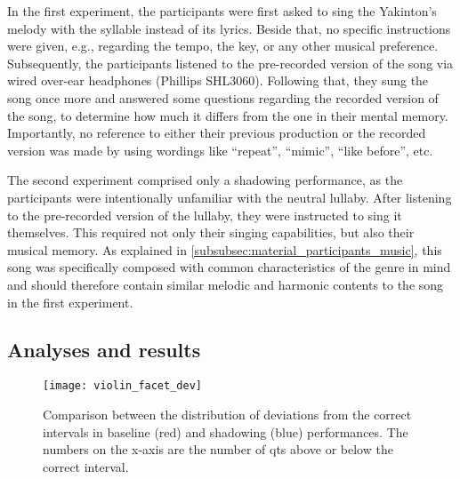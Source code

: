 In the first experiment, the participants were first asked to sing the Yakinton's melody with the syllable \textipa{[na]} instead of its lyrics.
Beside that, no specific instructions were given, e.g., regarding the tempo, the key, or any other musical preference.
Subsequently, the participants listened to the pre-recorded version of the song via wired over-ear headphones (Phillips SHL3060).
Following that, they sung the song once more and answered some questions regarding the recorded version of the song, to determine how much it differs from the one in their mental memory.
Importantly, no reference to either their previous production or the recorded version was made by using wordings like \enquote{repeat}, \enquote{mimic}, \enquote{like before}, etc.

The second experiment comprised only a shadowing performance, as the participants were intentionally unfamiliar with the neutral lullaby.
After listening to the pre-recorded version of the lullaby, they were instructed to sing it themselves.
This required not only their singing capabilities, but also their musical memory.
As explained in \cref{subsubsec:material_participants_music}, this song was specifically composed with common characteristics of the genre in mind and should therefore contain similar melodic and harmonic contents to the song in the first experiment.


\subsection{Analyses and results}
\label{subsec:results_music}

\begin{figure}[t]
	\centering
	\texttt{[image: violin\_facet\_dev]}
	\caption[Summary of within-participant interval deviation distribution]
		{Comparison between the distribution of deviations from the correct intervals in baseline (red) and shadowing (blue) performances.
		The numbers on the x-axis are the number of \acp{qt} above or below the correct interval.}
	\label{fig:violin_facet_dev}
\end{figure}

